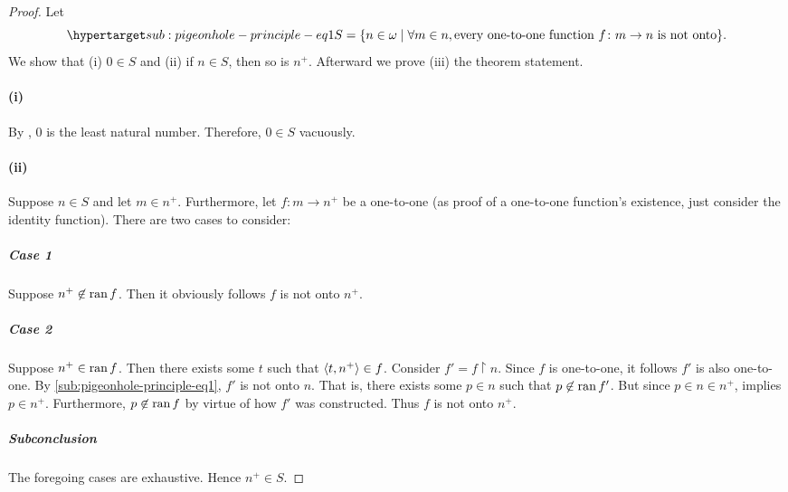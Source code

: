 \documentclass{report}
\begin{document}
  \begin{proof}

    Let
      \begin{equation}
        \hyperlabel{sub:pigeonhole-principle-eq1}
        S = \{n \in \omega \mid
          \forall m \in n, \text{every one-to-one function }
            f \colon m \rightarrow n \text{ is not onto}\}.
      \end{equation}
    We show that (i) $0 \in S$ and (ii) if $n \in S$, then so is $n^+$.
    Afterward we prove (iii) the theorem statement.

    \paragraph{(i)}%

      By , $0$ is the least natural
        number.
      Therefore, $0 \in S$ vacuously.

    \paragraph{(ii)}%

      Suppose $n \in S$ and let $m \in n^+$.
      Furthermore, let $f \colon m \rightarrow n^+$ be a one-to-one
         (as proof of a one-to-one function's existence,
        just consider the identity function).
      There are two cases to consider:

      \subparagraph{Case 1}%

        Suppose $n^+ \not\in \mathop{\text{ran}}{f}$.
        Then it obviously follows $f$ is not onto $n^+$.

      \subparagraph{Case 2}%

        Suppose $n^+ \in \mathop{\text{ran}}{f}$.
        Then there exists some $t$ such that $\left< t, n^+ \right> \in f$.
        Consider $f' = f \restriction n$.
        Since $f$ is one-to-one, it follows $f'$ is also one-to-one.
        By \eqref{sub:pigeonhole-principle-eq1}, $f'$ is not onto $n$.
        That is, there exists some $p \in n$ such that $p \not\in \mathop{\text{ran}}{f'}$.
        But since $p \in n \in n^+$,  implies
          $p \in n^+$.
        Furthermore, $p \not\in \mathop{\text{ran}}{f}$ by virtue of how $f'$ was constructed.
        Thus $f$ is not onto $n^+$.

      \subparagraph{Subconclusion}%

        The foregoing cases are exhaustive.
        Hence $n^+ \in S$.


\end{proof}
\end{document}

